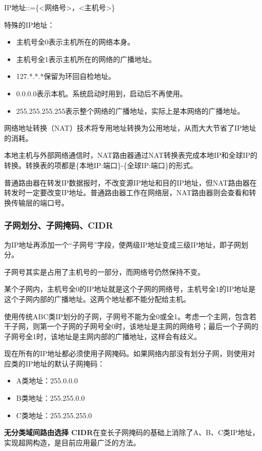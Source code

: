 \documentclass[12pt, a4paper, oneside]{ctexart}
\begin{document}
IP地址::=\{<网络号>，<主机号>\}

特殊的IP地址：
\begin{itemize}
    \item 主机号全0表示主机所在的网络本身。
    \item 主机号全1表示主机所在的网络的广播地址。
    \item 127.*.*.*保留为环回自检地址。
    \item 0.0.0.0表示本机。系统启动时用到，启动后不再使用。
    \item 255.255.255.255表示整个网络的广播地址，实际上是本网络的广播地址。
\end{itemize}

网络地址转换（NAT）技术将专用地址转换为公用地址，从而大大节省了IP地址的消耗。

本地主机与外部网络通信时，NAT路由器通过NAT转换表完成本地IP和全球IP的转换。转换表的项都是\{本地IP:端口\}-\{全球IP:端口\}的形式。

普通路由器在转发IP数据报时，不改变源IP地址和目的IP地址，但NAT路由器在转发时一定要改变IP地址。普通路由器工作在网络层，NAT路由器则会查看和转换传输层的端口号。

\subsubsection{子网划分、子网掩码、CIDR}

为IP地址再添加一个“子网号”字段，使两级IP地址变成三级IP地址，即子网划分。

子网号其实是占用了主机号的一部分，而网络号仍然保持不变。

某个子网内，主机号全0的IP地址就是这个子网的网络号，主机号全1的IP地址是这个子网内部的广播地址。这两个地址都不能分配给主机。

使用传统ABC类IP划分的子网，子网号不能为全0或全1。考虑一个主网，包含若干子网，则第一个子网的子网号全0时，该地址是主网的网络号；最后一个子网的子网号全1时，该地址是主网内部的广播地址，这样会有歧义。

现在所有的IP地址都必须使用子网掩码。如果网络内部没有划分子网，则使用对应类的IP地址的默认子网掩码：
\begin{itemize}
    \item A类地址：255.0.0.0
    \item B类地址：255.255.0.0
    \item C类地址：255.255.255.0
\end{itemize}

\textbf{无分类域间路由选择 CIDR}在变长子网掩码的基础上消除了A、B、C类IP地址，实现超网构造，是目前应用最广泛的方法。
\end{document}
